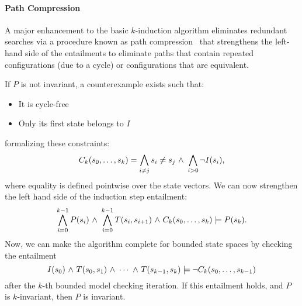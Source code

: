 \paragraph{Path Compression}  A major enhancement to the basic
$k$-induction 
algorithm eliminates redundant searches via a procedure
known as path compression~\cite{dMRS03} that strengthens the left-hand
side of the entailments to eliminate paths that contain repeated configurations  (due to
a cycle) or configurations that are equivalent.  

If $P$ is not invariant, a
counterexample exists such that:
\begin{itemize}
\item It is cycle-free
\item Only its first state belongs to $I$ 
\end{itemize}
formalizing these constraints:
$$C_k(s_0,\ldots,s_k) = \bigwedge_{i \neq j} s_i \neq s_j  {\ \wedge \ }
\bigwedge_{i > 0} {\neg} I(s_i),$$
where equality is defined  pointwise over the state vectors.
We can now strengthen the left hand side of the induction step
entailment:
$$\bigwedge^{k-1}_{i=0} P(s_i) {\ \wedge \ } \bigwedge ^{k-1}_{i=0}
T(s_i,s_{i+1}) {\ \wedge \ } C_k(s_0, \ldots, s_k) \models P(s_k). $$
Now, we can make the algorithm complete for bounded state spaces by
checking the entailment 
$$I(s_0) {\ \wedge \ } T(s_0,s_1) {\ \wedge \ } \cdots {\ \wedge \ } T(s_{k-1}, s_{k})
 \models {\neg} C_k(s_0,\ldots, s_{k-1})$$
after the $k$-th bounded model checking iteration.  If this entailment
holds, and $P$ is $k$-invariant, then $P$ is invariant. 

